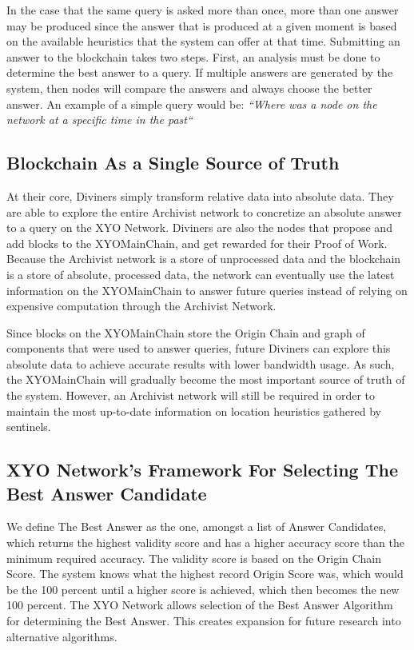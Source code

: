 \documentclass{article}
\begin{document}
In the case that the same query is asked more than once, more than one answer may be produced since the answer that is produced at a given moment is based on the available heuristics that the system can offer at that time.
Submitting an answer to the blockchain takes two steps. First, an analysis must be done to determine the best answer to a query. If multiple answers are generated by the system, then nodes will compare the answers and always choose the better answer. An example of a simple query would be: \textit{``Where was a node on the network at a specific time in the past``}

\subsection{Blockchain As a Single Source of Truth}

At their core, Diviners simply transform relative data into absolute data. They are able to explore the entire Archivist network to concretize an absolute answer to a query on the XYO Network. Diviners are also the nodes that propose and add blocks to the XYOMainChain, and get rewarded for their Proof of Work. Because the Archivist network is a store of unprocessed data and the blockchain is a store of absolute, processed data, the network can eventually use the latest information on the XYOMainChain to answer future queries instead of relying on expensive computation through the Archivist Network.

Since blocks on the XYOMainChain store the Origin Chain and graph of components that were used to answer queries, future Diviners can explore this absolute data to achieve accurate results with lower bandwidth usage. As such, the XYOMainChain will gradually become the most important source of truth of the system. However, an Archivist network will still be required in order to maintain the most up-to-date information on location heuristics gathered by sentinels.

\subsection{XYO Network’s Framework For Selecting The Best Answer Candidate}

We define The Best Answer as the one, amongst a list of Answer Candidates, which returns the highest validity score and has a higher accuracy score than the minimum required accuracy. The validity score is based on the Origin Chain Score. The system knows what the highest record Origin Score was, which would be the 100 percent until a higher score is achieved, which then becomes the new 100 percent. The XYO Network allows selection of the Best Answer Algorithm for determining the Best Answer. This creates expansion for future research into alternative algorithms.
\end{document}
